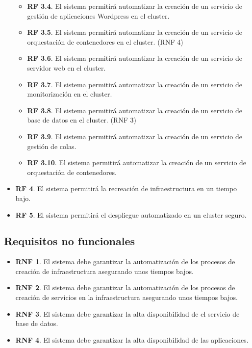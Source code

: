 \begin{itemize}
\begin{itemize}
			\item \textbf{RF 3.4}. El sistema permitirá automatizar la creación de un servicio de gestión de aplicaciones Wordpress en el cluster.
			\item \textbf{RF 3.5}. El sistema permitirá automatizar la creación de un servicio de orquestación de contenedores en el cluster. (RNF 4)
			\item \textbf{RF 3.6}. El sistema permitirá automatizar la creación de un servicio de servidor web en el cluster.
			\item \textbf{RF 3.7}. El sistema permitirá automatizar la creación de un servicio de monitorización en el cluster.
			\item \textbf{RF 3.8}. El sistema permitirá automatizar la creación de un servicio de base de datos en el cluster. (RNF 3)
			\item \textbf{RF 3.9}. El sistema permitirá automatizar la creación de un servicio de gestión de colas.
			\item \textbf{RF 3.10}. El sistema permitirá automatizar la creación de un servicio de orquestación de contenedores.
		\end{itemize}
	
	\item \textbf{RF 4}. El sistema permitirá la recreación de infraestructura en un tiempo bajo. \label{RF4}
	
	\item \textbf{RF 5}. El sistema permitirá el despliegue automatizado en un cluster seguro. \label{RF5}
	\end{itemize}

	\subsection{Requisitos no funcionales}
	\begin{itemize}
		\item \textbf{RNF 1}. El sistema debe garantizar la automatización de los procesos de creación de infraestructura asegurando unos tiempos bajos.
		\item \textbf{RNF 2}. El sistema debe garantizar la automatización de los procesos de creación de servicios en la infraestructura asegurando unos tiempos bajos.
		\item \textbf{RNF 3}. El sistema debe garantizar la alta disponibilidad de el servicio de base de datos.
		\item \textbf{RNF 4}. El sistema debe garantizar la alta disponibilidad de las aplicaciones.
	\end{itemize}

